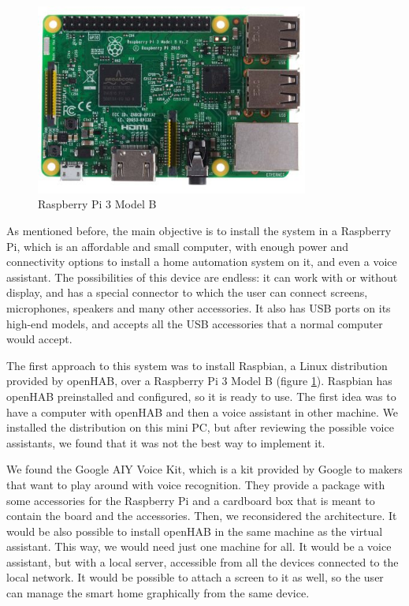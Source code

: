 \begin{figure}
    \centering
    \includegraphics[width=0.8\textwidth]{images/Chapter_06/raspberry-pi-3b.jpg}
    \caption{Raspberry Pi 3 Model B}
    \label{fig:raspberry-pi-3b}
\end{figure}

As mentioned before, the main objective is to install the system in a Raspberry Pi, which is an affordable and small computer,
with enough power and connectivity options to install a home automation system on it, and even a voice assistant. The possibilities
of this device are endless: it can work with or without display, and has a special connector to which the user can connect screens,
microphones, speakers and many other accessories. It also has USB ports on its high-end models, and accepts all the USB
accessories that a normal computer would accept.\cite{raspberryPiDocs}

The first approach to this system was to install Raspbian, a Linux distribution provided by openHAB, over a Raspberry Pi 3 Model B
(figure \ref{fig:raspberry-pi-3b}). Raspbian has openHAB preinstalled and configured, so it is ready to use. The first idea was to
have a computer with openHAB and then a voice assistant in other machine. We installed the distribution on this mini PC, but after
reviewing the possible voice assistants, we found that it was not the best way to implement it.

We found the Google AIY Voice Kit, which is a kit provided by Google to makers that want to play around with voice recognition.
They provide a package with some accessories for the Raspberry Pi and a cardboard box that is meant to contain the board and the
accessories. Then, we reconsidered the architecture. It would be also possible to install openHAB in the same machine as the virtual
assistant. This way, we would need just one machine for all. It would be a voice assistant, but with a local server, accessible from
all the devices connected to the local network. It would be possible to attach a screen to it as well, so the user can manage the
smart home graphically from the same device.

